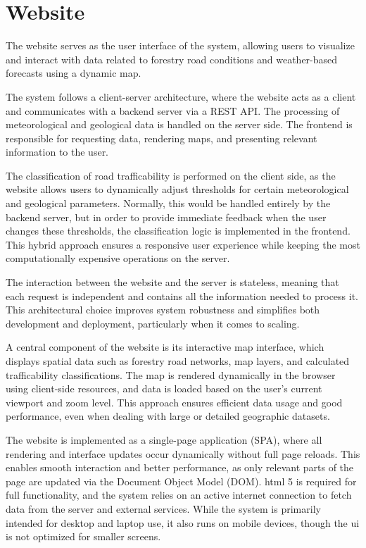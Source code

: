 \section{Website}

The website serves as the user interface of the system, allowing users to visualize and interact with data related to forestry road conditions and weather-based forecasts using a dynamic map.

The system follows a client-server architecture, where the website acts as a client and communicates with a backend server via a REST API. The processing of meteorological and geological data is handled on the server side. The frontend is responsible for requesting data, rendering maps, and presenting relevant information to the user.

The classification of road trafficability is performed on the client side, as the website allows users to dynamically adjust thresholds for certain meteorological and geological parameters. Normally, this would be handled entirely by the backend server, but in order to provide immediate feedback when the user changes these thresholds, the classification logic is implemented in the frontend. This hybrid approach ensures a responsive user experience while keeping the most computationally expensive operations on the server.

The interaction between the website and the server is stateless, meaning that each request is independent and contains all the information needed to process it. This architectural choice improves system robustness and simplifies both development and deployment, particularly when it comes to scaling.

A central component of the website is its interactive map interface, which displays spatial data such as forestry road networks, map layers, and calculated trafficability classifications. The map is rendered dynamically in the browser using client-side resources, and data is loaded based on the user’s current viewport and zoom level. This approach ensures efficient data usage and good performance, even when dealing with large or detailed geographic datasets.

The website is implemented as a single-page application (SPA), where all rendering and interface updates occur dynamically without full page reloads. This enables smooth interaction and better performance, as only relevant parts of the page are updated via the Document Object Model (DOM). \acrshort{html} 5 is required for full functionality, and the system relies on an active internet connection to fetch data from the server and external services. While the system is primarily intended for desktop and laptop use, it also runs on mobile devices, though the \acrshort{ui} is not optimized for smaller screens.

